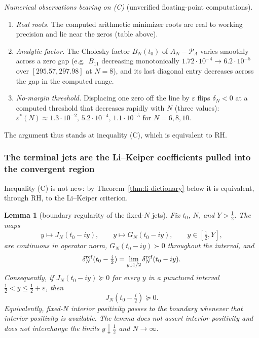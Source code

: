 \documentclass[11pt]{amsart}
\newtheorem{lemma}[theorem]{Lemma}
\theoremstyle{definition}
\theoremstyle{remark}
\theoremstyle{definition}
\newcommand{\half}{\tfrac{1}{2}}
\begin{document}
\emph{Numerical observations bearing on (C)} (unverified floating-point computations).
\begin{enumerate}[label=\textnormal{(E\arabic*)}]
\item \emph{Real roots.}  The computed arithmetic minimizer roots are real to working precision and
lie near the zeros (table above).
\item \emph{Analytic factor.}  The Cholesky factor $B_N(t_0)$ of $A_N-\mathcal P_\Lambda$ varies
smoothly across a zero gap (e.g.\ $B_{11}$ decreasing monotonically $1.72\!\cdot\!10^{-4}\to
6.2\!\cdot\!10^{-5}$ over $[295.57,297.98]$ at $N=8$), and its last diagonal entry decreases across the gap
in the computed range.
\item \emph{No-margin threshold.}  Displacing one zero off the line by $\varepsilon$ flips $\delta_N<0$
at a computed threshold that decreases rapidly with $N$ (three values):
$\varepsilon^*(N)\approx1.3\!\cdot\!10^{-2},\,5.2\!\cdot\!10^{-4},\,1.1\!\cdot\!10^{-5}$ for
$N=6,8,10$.
\end{enumerate}
The argument thus stands at inequality (C), which is equivalent to RH.

\subsubsection*{The terminal jets are the Li--Keiper coefficients pulled into the convergent region}

Inequality (C) is not new: by Theorem~\ref{thm:li-dictionary} below it is equivalent, through RH,
to the Li--Keiper criterion.

\begin{lemma}[boundary regularity of the fixed-$N$ jets]\label{lem:boundary-continuity}
Fix $t_0$, $N$, and $Y>\half$.  The maps
\[
   y\longmapsto J_N(t_0-iy),\qquad
   y\longmapsto G_N(t_0-iy),\qquad y\in[\half,Y],
\]
are continuous in operator norm, $G_N(t_0-iy)\succ0$ throughout the interval, and
\[
   \delta_N^{\rm ref}(t_0-\tfrac i2)=\lim_{y\downarrow1/2}\delta_N^{\rm ref}(t_0-iy).
\]
Consequently, if $J_N(t_0-iy)\succeq0$ for every $y$ in a punctured interval
$\half<y\le\half+\varepsilon$, then
\[
   J_N(t_0-\tfrac i2)\succeq0.
\]
Equivalently, fixed-$N$ interior positivity passes to the boundary whenever that interior positivity is
available.  The lemma does not assert interior positivity and does not interchange the limits
$y\downarrow\half$ and $N\to\infty$.
\end{lemma}
\end{document}
